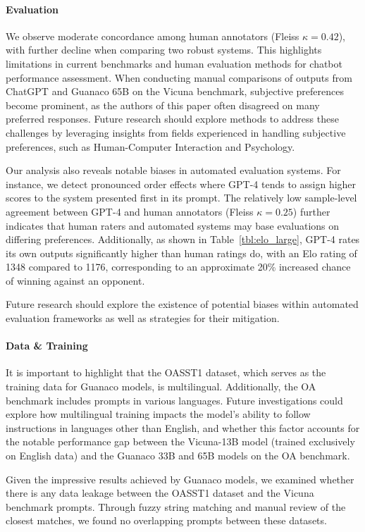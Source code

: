 \paragraph{Evaluation}

We observe moderate concordance among human annotators (Fleiss $\kappa=0.42$), with further decline when comparing two robust systems. This highlights limitations in current benchmarks and human evaluation methods for chatbot performance assessment. When conducting manual comparisons of outputs from ChatGPT and {Guanaco} 65B on the Vicuna benchmark, subjective preferences become prominent, as the authors of this paper often disagreed on many preferred responses. Future research should explore methods to address these challenges by leveraging insights from fields experienced in handling subjective preferences, such as Human-Computer Interaction and Psychology.

Our analysis also reveals notable biases in automated evaluation systems. For instance, we detect pronounced order effects where GPT-4 tends to assign higher scores to the system presented first in its prompt. The relatively low sample-level agreement between GPT-4 and human annotators (Fleiss $\kappa=0.25$) further indicates that human raters and automated systems may base evaluations on differing preferences. Additionally, as shown in Table~\ref{tbl:elo_large}, GPT-4 rates its own outputs significantly higher than human ratings do, with an Elo rating of 1348 compared to 1176, corresponding to an approximate 20\% increased chance of winning against an opponent.

Future research should explore the existence of potential biases within automated evaluation frameworks as well as strategies for their mitigation.

\paragraph{Data \& Training} It is important to highlight that the OASST1 dataset, which serves as the training data for {Guanaco} models, is multilingual. Additionally, the OA benchmark includes prompts in various languages. Future investigations could explore how multilingual training impacts the model's ability to follow instructions in languages other than English, and whether this factor accounts for the notable performance gap between the Vicuna-13B model (trained exclusively on English data) and the {Guanaco} 33B and 65B models on the OA benchmark.

Given the impressive results achieved by {Guanaco} models, we examined whether there is any data leakage between the OASST1 dataset and the Vicuna benchmark prompts. Through fuzzy string matching and manual review of the closest matches, we found no overlapping prompts between these datasets.

